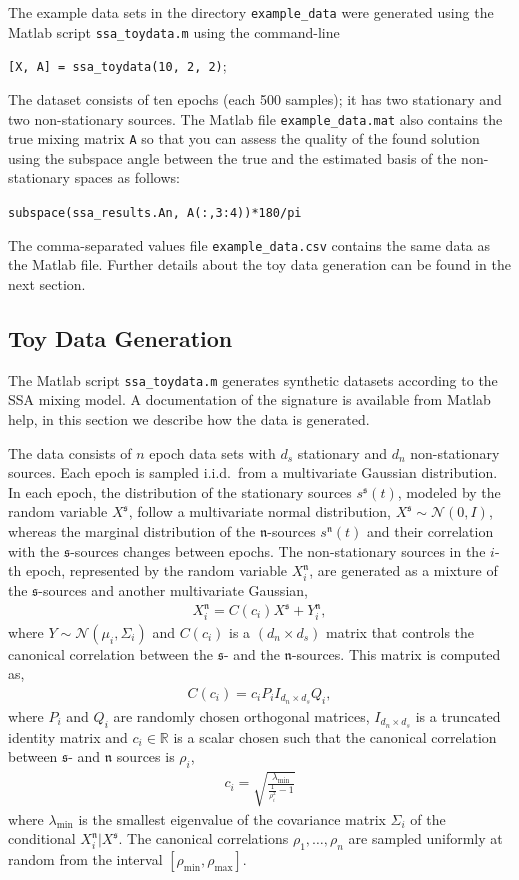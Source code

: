\documentclass{article}
\newcommand{\R}{\ensuremath{\mathds{R}}}
\newcommand{\N}{\ensuremath{\mathcal{N}}}
\newcommand{\1}{\ensuremath{\mathds{1}}}
\newcommand{\s}{\ensuremath{\mathfrak{s}}}
\newcommand{\n}{\ensuremath{\mathfrak{n}}}
\newcommand{\0}{\ensuremath{0}}
\begin{document}
The example data sets in the directory \texttt{example\_data} were generated using the Matlab 
script \texttt{ssa\_toydata.m} using the command-line
\begin{center}
	\texttt{[X, A] = ssa\_toydata(10, 2, 2)}; 
\end{center}
The dataset consists of ten epochs (each 500 samples); it has two stationary and two non-stationary 
sources. The Matlab file \texttt{example\_data.mat} also contains the true mixing matrix \texttt{A} 
so that you can assess the quality of the found solution using the subspace angle between the true
and the estimated basis of the non-stationary spaces as follows:
\begin{center}
	\texttt{subspace(ssa\_results.An, A(:,3:4))*180/pi}  
\end{center}
The comma-separated values file \texttt{example\_data.csv} contains the same data as the Matlab file. 
Further details about the toy data generation can be found in the next section. 

\subsection{Toy Data Generation}

The Matlab script \texttt{ssa\_toydata.m} generates synthetic datasets according to the SSA mixing 
model. A documentation of the signature is available from Matlab help, in this section we describe 
how the data is generated. 

The data consists of $n$ epoch data sets with $d_s$ stationary and $d_n$ non-stationary sources. 
Each epoch is sampled i.i.d.~from a multivariate Gaussian distribution. In each epoch, the distribution 
of the stationary sources $s^\s(t)$, modeled by the random variable $X^\s$, follow a multivariate normal 
distribution, $X^\s \sim \N(0,I)$, whereas the marginal distribution of the \n-sources $s^\n(t)$ and their 
correlation with the \s-sources changes between epochs. The non-stationary sources in the $i$-th epoch, 
represented by the random variable $X^\n_i$, are generated as a mixture of the \s-sources and another
multivariate Gaussian, 
\begin{align*}
	X^\n_i = C(c_i) X^\s + Y^\n_i ,
\end{align*}
where $Y \sim \N(\mu_i, \Sigma_i)$ and $C(c_i)$ is a $(d_n \times d_s)$ matrix that controls the canonical 
correlation between the \s- and the \n-sources. This matrix is computed as,
\begin{align*}
	C(c_i) = c_i P_i I_{d_n \times d_s} Q_i,
\end{align*} 
where $P_i$ and $Q_i$ are randomly chosen orthogonal matrices, $I_{d_n \times d_s}$ is a 
truncated identity matrix and $c_i \in \R$ is a scalar chosen such that the canonical 
correlation between $\s$- and $\n$ sources is $\rho_i$, 
\begin{align*}
	c_i = \sqrt{\frac{\lambda_\text{min}}{\frac{1}{\rho^2_i}-1}}
\end{align*}
where $\lambda_\text{min}$ is the smallest eigenvalue of the covariance matrix $\Sigma_i$ of the 
conditional $X^\n_i | X^\s$. The canonical correlations $\rho_1, \ldots, \rho_n$ are sampled
uniformly at random from the interval $[\rho_\text{min}, \rho_\text{max}]$. 
\end{document}
